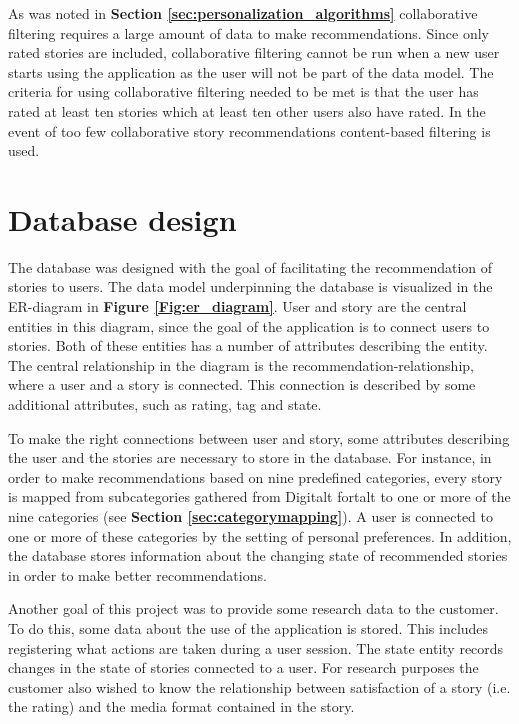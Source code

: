 As was noted in \textbf{Section \ref{sec:personalization_algorithms}} collaborative filtering requires a large amount of data to make recommendations. Since only rated stories are included, collaborative filtering cannot be run when a new user starts using the application as the user will not be part of the data model. The criteria for using collaborative filtering needed to be met is that the user has rated at least ten stories which at least ten other users also have rated. In the event of too few collaborative story recommendations content-based filtering is used. 

\section{Database design}
\label{sec:database_design}

The database was designed with the goal of facilitating the recommendation of stories to users. The data model underpinning the database is visualized in the ER-diagram in \textbf{Figure \ref{Fig:er_diagram}}. User and story are the central entities in this diagram, since the goal of the application is to connect users to stories. Both of these entities has a number of attributes describing the entity. The central relationship in the diagram is the recommendation-relationship, where a user and a story is connected. This connection is described by some additional attributes, such as rating, tag and state. \newline

To make the right connections between user and story, some attributes describing the user and the stories are necessary to store in the database. For instance, in order to make recommendations based on nine predefined categories, every story is mapped from subcategories gathered from Digitalt fortalt to one or more of the nine categories (see \textbf{Section \ref{sec:categorymapping}}). A user is connected to one or more of these categories by the setting of personal preferences. In addition, the database stores information about the changing state of recommended stories in order to make better recommendations. \newline

Another goal of this project was to provide some research data to the customer. To do this, some data about the use of the application is stored. This includes registering what actions are taken during a user session. The state entity records changes in the state of stories connected to a user. For research purposes the customer also wished to know the relationship between satisfaction of a story (i.e. the rating) and the media format contained in the story.

